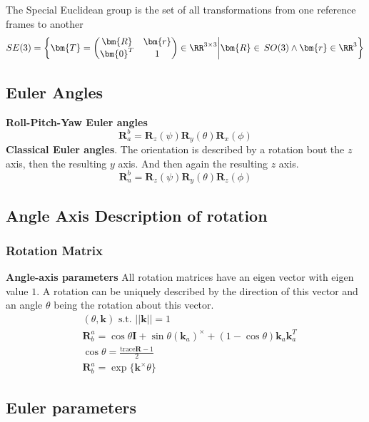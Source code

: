 The Special Euclidean group is the set of all transformations from one reference frames to another
\[
SE(3) = \left\{\bm{T} = \begin{pmatrix}\bm{R} & \bm{r} \\ \bm{0}^T & 1 \end{pmatrix}\in\RR^{3\times3}\middle|\bm{R}\in\,SO(3) \wedge \bm{r}\in\RR^3\right\}
\]

\setcounter{subsection}{4}
\subsection{Euler Angles} %


\textbf{Roll-Pitch-Yaw Euler angles}
\[\bm{R}_a^b = \bm{R}_z(\psi)\bm{R}_y(\theta)\bm{R}_x(\phi)\]
\textbf{Classical Euler angles}. The orientation is described by a rotation bout the \(z\) axis, then the resulting \(y\) axis. And then again the resulting \(z\) axis.
\[\bm{R}_a^b = \bm{R}_z(\psi)\bm{R}_y(\theta)\bm{R}_z(\phi)\]

\subsection{Angle Axis Description of rotation} %
\setcounter{subsubsection}{4}
\subsubsection{Rotation Matrix}

\textbf{Angle-axis parameters} All rotation matrices have an eigen vector with eigen value \(1\). A rotation can be uniquely described by the direction of this vector and an angle \(\theta\) being the rotation about this vector.
\begin{align*}
    & (\theta,\bm{k})\text{ s.t. }||\bm{k}|| = 1 \\
    & \bm{R}_b^a = \cos\theta\bm{I} + \sin\theta(\bm{k}_a)^\times + (1-\cos\theta)\bm{k}_a\bm{k}_a^T \\
    & \cos \theta = \frac{\textrm{trace}\bm{R}-1}{2} \\
    & \bm{R}_b^a = \exp\{\bm{k}^\times\theta\}
\end{align*}

\subsection{Euler parameters} %
